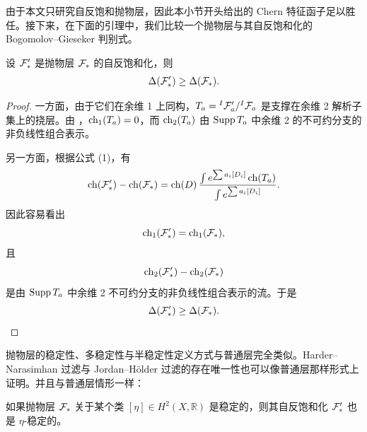 由于本文只研究自反饱和抛物层，因此本小节开头给出的 Chern 特征函子足以胜任。接下来，在下面的引理中，我们比较一个抛物层与其自反饱和化的 Bogomolov--Gieseker 判别式。

\begin{lemma}
设 \(\mathcal{F}'_*\) 是抛物层 \(\mathcal{F}_*\) 的自反饱和化，则
\[
\Delta(\mathcal{F}'_*)\ge \Delta(\mathcal{F}_*).
\]
\end{lemma}

\begin{proof}
一方面，由于它们在余维 1 上同构，\(T_a={}^{I}\mathcal{F}'_a/{}^{I}\mathcal{F}_a\) 是支撑在余维 2 解析子集上的挠层。由 \cite[Theorem 1.1]{Kf}，\(\operatorname{ch}_1(T_a)=0\)，而 \(\operatorname{ch}_2(T_a)\) 由 \(\operatorname{Supp} T_a\) 中余维 2 的不可约分支的非负线性组合表示。

另一方面，根据公式 (1)，有
\[
\operatorname{ch}(\mathcal{F}'_*)-\operatorname{ch}(\mathcal{F}_*)
=
\operatorname{ch}(D)\,
\frac{\int e^{\sum a_i[D_i]}\operatorname{ch}(T_a)}
{\int e^{\sum a_i[D_i]}}.
\]
因此容易看出
\[
\operatorname{ch}_1(\mathcal{F}'_*)=\operatorname{ch}_1(\mathcal{F}_*),
\]
且
\[
\operatorname{ch}_2(\mathcal{F}'_*)-\operatorname{ch}_2(\mathcal{F}_*)
\]
是由 \(\operatorname{Supp} T_a\) 中余维 2 不可约分支的非负线性组合表示的流。于是
\[
\Delta(\mathcal{F}'_*)\ge \Delta(\mathcal{F}_*).
\]
\end{proof}

抛物层的稳定性、多稳定性与半稳定性定义方式与普通层完全类似。Harder--Narasimhan 过滤与 Jordan--H\"older 过滤的存在唯一性也可以像普通层那样形式上证明。并且与普通层情形一样：

\begin{lemma}
如果抛物层 \(\mathcal{F}_*\) 关于某个类 \([\eta]\in H^2(X,\mathbb R)\) 是稳定的，则其自反饱和化 \(\mathcal{F}'_*\) 也是 \(\eta\)-稳定的。
\end{lemma}
